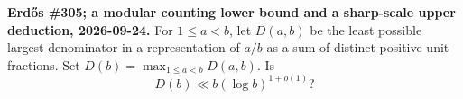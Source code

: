 \textbf{Erd\H{o}s \#305; a modular counting lower bound and a sharp-scale upper deduction, 2026-09-24.}
For $1\leq a<b$, let $D(a,b)$ be the least possible largest denominator in a representation of $a/b$ as a sum of distinct positive unit fractions. Set $D(b)=\max_{1\leq a<b}D(a,b)$. Is
\[
D(b)\ll b(\log b)^{1+o(1)}?
\]
